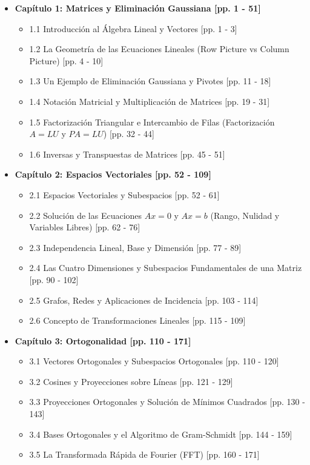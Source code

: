 \documentclass[11pt,a4paper]{article}
\begin{document}
\begin{itemize}
    \item \textbf{Capítulo 1: Matrices y Eliminación Gaussiana [pp. 1 - 51]}
    \begin{itemize}
        \item 1.1 Introducción al Álgebra Lineal y Vectores [pp. 1 - 3]
        \item 1.2 La Geometría de las Ecuaciones Lineales (Row Picture vs Column Picture) [pp. 4 - 10]
        \item 1.3 Un Ejemplo de Eliminación Gaussiana y Pivotes [pp. 11 - 18]
        \item 1.4 Notación Matricial y Multiplicación de Matrices [pp. 19 - 31]
        \item 1.5 Factorización Triangular e Intercambio de Filas (Factorización $A = LU$ y $PA = LU$) [pp. 32 - 44]
        \item 1.6 Inversas y Transpuestas de Matrices [pp. 45 - 51]
    \end{itemize}

    \item \textbf{Capítulo 2: Espacios Vectoriales [pp. 52 - 109]}
    \begin{itemize}
        \item 2.1 Espacios Vectoriales y Subespacios [pp. 52 - 61]
        \item 2.2 Solución de las Ecuaciones $Ax = 0$ y $Ax = b$ (Rango, Nulidad y Variables Libres) [pp. 62 - 76]
        \item 2.3 Independencia Lineal, Base y Dimensión [pp. 77 - 89]
        \item 2.4 Las Cuatro Dimensiones y Subespacios Fundamentales de una Matriz [pp. 90 - 102]
        \item 2.5 Grafos, Redes y Aplicaciones de Incidencia [pp. 103 - 114]
        \item 2.6 Concepto de Transformaciones Lineales [pp. 115 - 109]
    \end{itemize}

    \item \textbf{Capítulo 3: Ortogonalidad [pp. 110 - 171]}
    \begin{itemize}
        \item 3.1 Vectores Ortogonales y Subespacios Ortogonales [pp. 110 - 120]
        \item 3.2 Cosines y Proyecciones sobre Líneas [pp. 121 - 129]
        \item 3.3 Proyecciones Ortogonales y Solución de Mínimos Cuadrados [pp. 130 - 143]
        \item 3.4 Bases Ortogonales y el Algoritmo de Gram-Schmidt [pp. 144 - 159]
        \item 3.5 La Transformada Rápida de Fourier (FFT) [pp. 160 - 171]
    \end{itemize}


\end{itemize}
\end{document}
